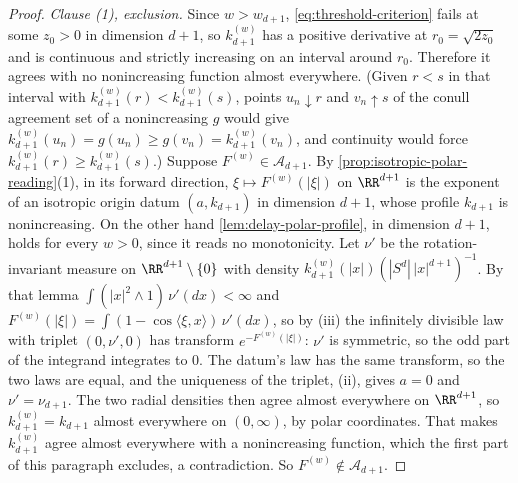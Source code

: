 \begin{proof}
\emph{Clause (1), exclusion.} Since $w > w_{d+1}$, \ref{eq:threshold-criterion} fails at some
$z_0 > 0$ in dimension $d+1$, so $k^{(w)}_{d+1}$ has a positive derivative at
$r_0 = \sqrt{2z_0}$ and is continuous and strictly increasing on an interval around $r_0$.
Therefore it agrees with no nonincreasing function almost everywhere. (Given $r < s$ in that
interval with $k^{(w)}_{d+1}(r) < k^{(w)}_{d+1}(s)$, points $u_n \downarrow r$ and
$v_n \uparrow s$ of the conull agreement set of a nonincreasing $g$ would give
$k^{(w)}_{d+1}(u_n) = g(u_n) \ge g(v_n) = k^{(w)}_{d+1}(v_n)$, and continuity would force
$k^{(w)}_{d+1}(r) \ge k^{(w)}_{d+1}(s)$.) Suppose $F^{(w)} \in \mathcal{A}_{d+1}$. By
\ref{prop:isotropic-polar-reading}(1), in its forward direction, $\xi \mapsto F^{(w)}(|\xi|)$ on
$\RR^{d+1}$ is the exponent of an isotropic origin datum $(a, k_{d+1})$ in dimension $d+1$, whose
profile $k_{d+1}$ is nonincreasing. On the other hand \ref{lem:delay-polar-profile}, in dimension
$d+1$, holds for every $w > 0$, since it reads no monotonicity. Let $\nu'$ be the rotation-invariant
measure on $\RR^{d+1} \setminus \{0\}$ with density $k^{(w)}_{d+1}(|x|)(|S^{d}|\,|x|^{d+1})^{-1}$.
By that lemma $\int(|x|^2 \wedge 1)\,\nu'(dx) < \infty$ and
$F^{(w)}(|\xi|) = \int(1 - \cos\langle\xi,x\rangle)\,\nu'(dx)$, so by (iii) the
infinitely divisible law with triplet $(0,\nu',0)$ has transform $e^{-F^{(w)}(|\xi|)}$: $\nu'$ is
symmetric, so the odd part of the integrand integrates to $0$. The datum's
law has the same transform, so the two laws are equal, and the uniqueness of the triplet,
(ii), gives $a = 0$ and $\nu' = \nu_{d+1}$. The two radial densities then agree almost
everywhere on $\RR^{d+1}$, so $k^{(w)}_{d+1} = k_{d+1}$ almost everywhere on $(0,\infty)$, by polar
coordinates. That makes $k^{(w)}_{d+1}$ agree almost everywhere with a nonincreasing function, which
the first part of this paragraph excludes, a contradiction. So $F^{(w)} \notin \mathcal{A}_{d+1}$.


\end{proof}
